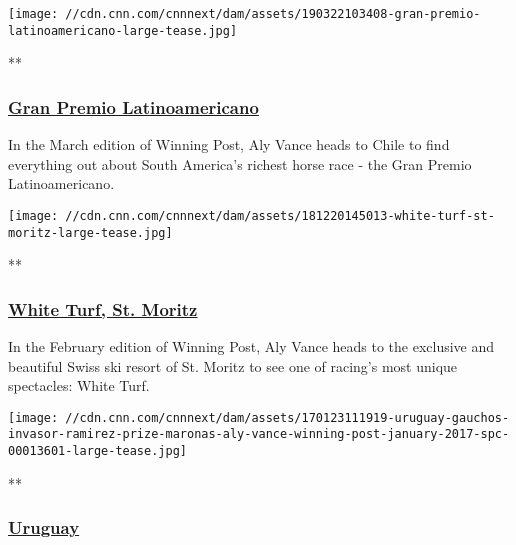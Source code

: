 \href{/videos/sports/2019/10/31/gran-premio-latinoamericano-chile-horse-racing-winning-post-vision-spt-intl.cnn}{}

\texttt{[image: //cdn.cnn.com/cnnnext/dam/assets/190322103408-gran-premio-latinoamericano-large-tease.jpg]}

**

\hypertarget{gran-premio-latinoamericano}{%
\subsubsection{\texorpdfstring{\href{/videos/sports/2019/10/31/gran-premio-latinoamericano-chile-horse-racing-winning-post-vision-spt-intl.cnn}{Gran
Premio
Latinoamericano}}{Gran Premio Latinoamericano}}\label{gran-premio-latinoamericano}}

In the March edition of Winning Post, Aly Vance heads to Chile to find
everything out about South America's richest horse race - the Gran
Premio Latinoamericano.

\href{/videos/sports/2019/11/01/white-turf-st-moritz-switzerland-snow-racing-horse-winning-post-vision-spt-intl.cnn}{}

\texttt{[image: //cdn.cnn.com/cnnnext/dam/assets/181220145013-white-turf-st-moritz-large-tease.jpg]}

**

\hypertarget{white-turf-st-moritz}{%
\subsubsection{\texorpdfstring{\href{/videos/sports/2019/11/01/white-turf-st-moritz-switzerland-snow-racing-horse-winning-post-vision-spt-intl.cnn}{White
Turf, St. Moritz}}{White Turf, St. Moritz}}\label{white-turf-st-moritz}}

In the February edition of Winning Post, Aly Vance heads to the
exclusive and beautiful Swiss ski resort of St. Moritz to see one of
racing's most unique spectacles: White Turf.

\href{/videos/sports/2019/11/01/uruguay-gauchos-polo-invasor-horse-racing-winning-post-vision-spt-intl.cnn}{}

\texttt{[image: //cdn.cnn.com/cnnnext/dam/assets/170123111919-uruguay-gauchos-invasor-ramirez-prize-maronas-aly-vance-winning-post-january-2017-spc-00013601-large-tease.jpg]}

**

\hypertarget{uruguay}{%
\subsubsection{\texorpdfstring{\href{/videos/sports/2019/11/01/uruguay-gauchos-polo-invasor-horse-racing-winning-post-vision-spt-intl.cnn}{Uruguay}}{Uruguay}}\label{uruguay}}

